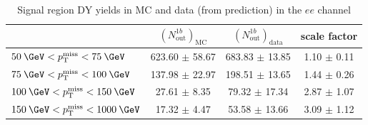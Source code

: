 \begin{table}[!htbp]
  \caption{DY yields and \Rinout values in the $\mu\mu$ channel, for $\geq$1 b-tag selection}
  \label{tab:Rinout_1b_mm}
\end{table}


\begin{table}[!htbp]
  \caption{Signal region DY yields in MC and data (from \Rinout prediction) in the $ee$ channel}
  \begin{tabular}{l|c|c|c}
    \hline
                                     & $(N^{1b}_\text{out})_\text{MC}$ & $(N^{1b}_\text{out})_\text{data}$ & scale factor \\ \hline
    $50\:\GeV<\ptmiss<75\:\GeV$      & 623.60 $\pm$  58.67         & 683.83 $\pm$ 13.85         & 1.10 $\pm$ 0.11 \\ 
    $75\:\GeV<\ptmiss<100\:\GeV$     & 137.98 $\pm$  22.97         & 198.51 $\pm$ 13.65           & 1.44 $\pm$ 0.26 \\
    $100\:\GeV<\ptmiss<150\:\GeV$    & 27.61 $\pm$   8.35          & 79.32 $\pm$ 17.34          & 2.87 $\pm$ 1.07 \\
    $150\:\GeV<\ptmiss<1000\:\GeV$   & 17.32 $\pm$   4.47          & 53.58 $\pm$ 13.66         & 3.09 $\pm$ 1.12 \\\hline
  \end{tabular}
  \label{tab:Rinout_SF_ee}
\end{table}


